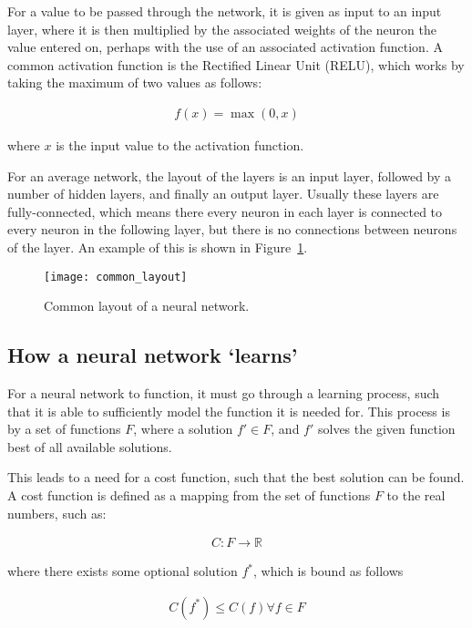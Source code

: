 For a value to be passed through the network, it is given as input to an input
layer, where it is then multiplied by the associated weights of the neuron the
value entered on, perhaps with the use of an associated activation function. A
common activation function is the Rectified Linear Unit
(RELU)\cite{Nair:2010:RLU:3104322.3104425}, which works by taking the maximum
of two values as follows:

\begin{align}
    f(x) = \max(0, x)
\end{align}

where $x$ is the input value to the activation function.

For an average network, the layout of the layers is an input layer,
followed by a number of hidden layers, and finally an output layer. Usually
these layers are fully-connected, which means there every neuron in each
layer is connected to every neuron in the following layer, but
there is no connections between neurons of the layer. An example of this
is shown in Figure~\ref{fig:common_layout}.

\begin{figure}
    \centering
    \texttt{[image: common\_layout]}
    \caption{Common layout of a neural network.}%
    \label{fig:common_layout}
\end{figure}

\subsection{How a neural network `learns'}

For a neural network to function, it must go through a learning process, such
that it is able to sufficiently model the function it is needed for. This process
is by a set of functions $F$, where a solution $f' \in F$, and $f'$ solves
the given function best of all available solutions.

This leads to a need for a cost function, such that the best solution can be found.
A cost function is defined as a mapping from the set of functions $F$ to the real
numbers, such as:

\begin{align}
    C : F \rightarrow \mathbb{R}
\end{align}

where there exists some optional solution $f^*$, which is bound as follows

\begin{align}
    C(f^*) \le C(f) \forall f \in F
\end{align}

